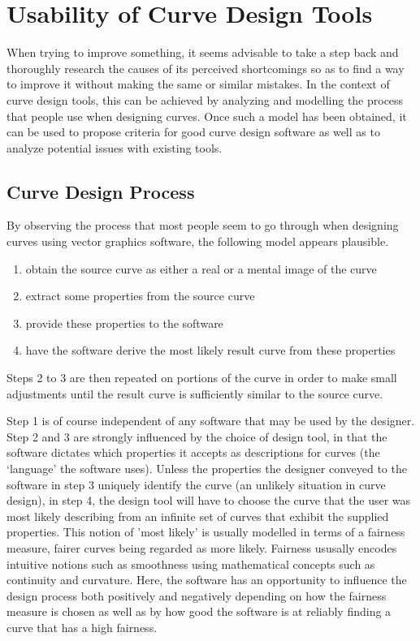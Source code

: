 \documentclass[a4paper]{article}
\begin{document}

	\section{Usability of Curve Design Tools}

		When trying to improve something, it seems advisable to take a step back and thoroughly research the causes of its perceived shortcomings so as to find a way to improve it without making the same or similar mistakes. In the context of curve design tools, this can be achieved by analyzing and modelling the process that people use when designing curves. Once such a model has been obtained, it can be used to propose criteria for good curve design software as well as to analyze potential issues with existing tools.

		\subsection{Curve Design Process}
		\label{section:CurveDesignProcess}

			By observing the process that most people seem to go through when designing curves using vector graphics software, the following model appears plausible.

			\begin{enumerate}
				\item obtain the source curve as either a real or a mental image of the curve
				\item extract some properties from the source curve
				\item provide these properties to the software
				\item have the software derive the most likely result curve from these properties
			\end{enumerate}

			Steps 2 to 3 are then repeated on portions of the curve in order to make small adjustments until the result curve is sufficiently similar to the source curve.

			Step 1 is of course independent of any software that may be used by the designer. Step 2 and 3 are strongly influenced by the choice of design tool, in that the software dictates which properties it accepts as descriptions for curves (the `language' the software uses). Unless the properties the designer conveyed to the software in step 3 uniquely identify the curve (an unlikely situation in curve design), in step 4, the design tool will have to choose the curve that the user was most likely describing from an infinite set of curves that exhibit the supplied properties. This notion of 'most likely' is usually modelled in terms of a fairness measure, fairer curves being regarded as more likely. Fairness ususally encodes intuitive notions such as smoothness using mathematical concepts such as continuity and curvature. Here, the software has an opportunity to influence the design process both positively and negatively depending on how the fairness measure is chosen as well as by how good the software is at reliably finding a curve that has a high fairness.
\end{document}
